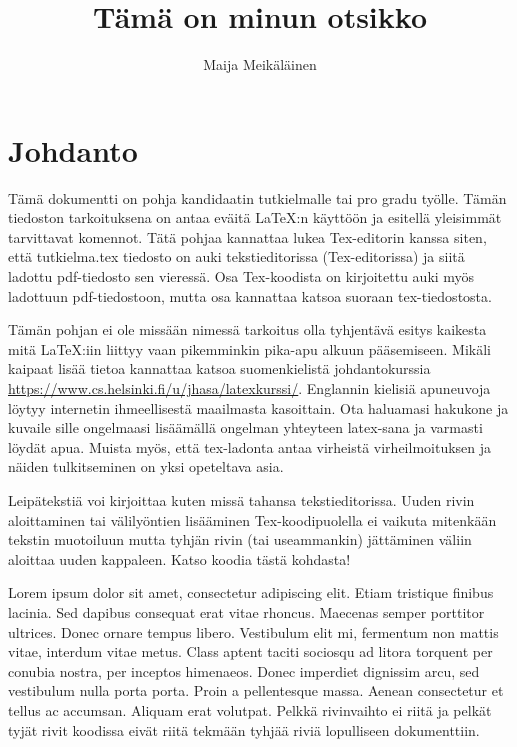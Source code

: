 \documentclass[a4paper,12 pt]{article}
\author{Maija Meikäläinen}
\title{Tämä on minun otsikko}
\theoremstyle{plain}
\theoremstyle{definition}
\theoremstyle{remark}
\numberwithin{equation}{section}
\numberwithin{figure}{section}
\begin{document}
\maketitle

\newpage
\tableofcontents

\newpage
\section*{Johdanto}

Tämä dokumentti on pohja kandidaatin tutkielmalle tai pro gradu työlle. Tämän tiedoston tarkoituksena on antaa eväitä \LaTeX :n käyttöön ja esitellä yleisimmät tarvittavat komennot. Tätä pohjaa kannattaa lukea Tex-editorin kanssa siten, että tutkielma.tex tiedosto on auki tekstieditorissa (Tex-editorissa) ja siitä ladottu pdf-tiedosto sen vieressä. Osa Tex-koodista on kirjoitettu auki myös ladottuun pdf-tiedostoon, mutta osa kannattaa katsoa suoraan tex-tiedostosta.

Tämän pohjan ei ole missään nimessä tarkoitus olla tyhjentävä esitys kaikesta mitä \LaTeX :iin liittyy vaan pikemminkin pika-apu alkuun pääsemiseen. Mikäli kaipaat lisää tietoa kannattaa katsoa suomenkielistä johdantokurssia \url{https://www.cs.helsinki.fi/u/jhasa/latexkurssi/}. Englannin kielisiä apuneuvoja löytyy internetin ihmeellisestä maailmasta kasoittain. Ota haluamasi hakukone
 ja kuvaile sille ongelmaasi lisäämällä ongelman yhteyteen latex-sana ja varmasti löydät apua. Muista myös, että tex-ladonta antaa virheistä virheilmoituksen ja näiden tulkitseminen on yksi opeteltava asia. 

Leipätekstiä voi kirjoittaa kuten missä tahansa tekstieditorissa.
Uuden rivin aloittaminen tai välilyöntien lisääminen Tex-koodipuolella ei vaikuta mitenkään tekstin muotoiluun mutta tyhjän rivin (tai useammankin) jättäminen väliin aloittaa uuden kappaleen. Katso koodia tästä kohdasta!


Lorem ipsum dolor sit amet, consectetur adipiscing elit. Etiam tristique finibus lacinia. Sed dapibus consequat erat vitae rhoncus. Maecenas semper porttitor ultrices. Donec ornare tempus libero. Vestibulum elit mi, fermentum non mattis vitae, interdum vitae metus. Class aptent taciti sociosqu ad litora torquent per conubia nostra, per inceptos himenaeos. Donec imperdiet dignissim arcu, sed vestibulum nulla porta porta. Proin a pellentesque massa. Aenean consectetur et tellus ac accumsan. Aliquam erat volutpat. Pelkkä rivinvaihto ei riitä ja pelkät tyjät rivit koodissa eivät riitä tekmään tyhjää riviä lopulliseen dokumenttiin.
\end{document}

